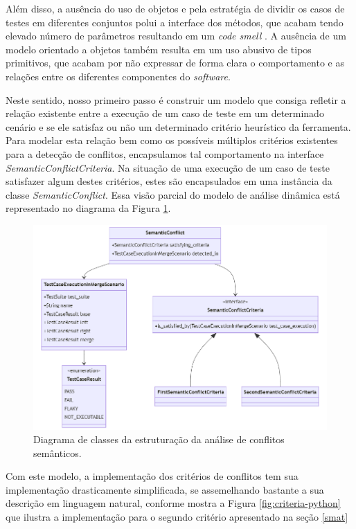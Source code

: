 \documentclass[12pt]{article}
\begin{document}
Além disso, a ausência do uso de objetos e pela estratégia de dividir os casos de testes em diferentes conjuntos polui a interface dos métodos, que acabam tendo elevado número de parâmetros resultando em um \textit{code smell} \cite{fowler2018refactoring}. A ausência de um modelo orientado a objetos também resulta em um uso abusivo de tipos primitivos, que acabam por não expressar de forma clara o comportamento e as relações entre os diferentes componentes do \textit{software}.

Neste sentido, nosso primeiro passo é construir um modelo que consiga refletir a relação existente entre a execução de um caso de teste em um determinado cenário e se ele satisfaz ou não um determinado critério heurístico da ferramenta. Para modelar esta relação bem como os possíveis múltiplos critérios existentes para a detecção de conflitos, encapsulamos tal comportamento na interface \textit{SemanticConflictCriteria}. Na situação de uma execução de um caso de teste satisfazer algum destes critérios, estes são encapsulados em uma instância da classe \textit{SemanticConflict}. Essa visão parcial do modelo de análise dinâmica está representado no diagrama da Figura \ref{fig:criteria}.

\begin{figure}[H]
    \centering
    \includegraphics[width=\textwidth]{criteria.png}
    \caption{Diagrama de classes da estruturação da análise de conflitos semânticos.}
    \label{fig:criteria}
\end{figure}

Com este modelo, a implementação dos critérios de conflitos tem sua implementação drasticamente simplificada, se assemelhando bastante a sua descrição em linguagem natural, conforme mostra a Figura \ref{fig:criteria-python} que ilustra a implementação para o segundo critério apresentado na seção \ref{smat}
\end{document}
